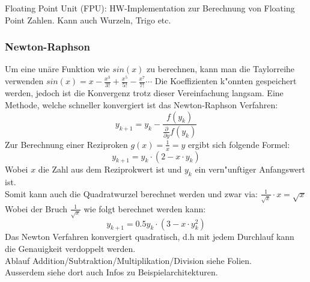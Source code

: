 Floating Point Unit (FPU): HW-Implementation zur Berechnung von Floating Point Zahlen. Kann auch Wurzeln, Trigo etc.\\

\subsubsection{Newton-Raphson}
Um eine unäre Funktion wie $sin(x)$ zu berechnen, kann man die Taylorreihe verwenden $sin(x) = x - \frac{x^3}{3!} + \frac{x^5}{5!} - \frac{x^7}{7!}\cdots$ Die Koeffizienten k"onnten gespeichert werden, jedoch ist die Konvergenz trotz dieser Vereinfachung langsam. 
Eine Methode, welche schneller konvergiert ist das Newton-Raphson Verfahren: 
\begin{equation}
y_{k+1} = y_k - \frac{f(y_k)}{\frac{\partial}{\partial y}f(y_k)}
\end{equation}
Zur Berechnung einer Reziproken $g(x)=\frac{1}{x}=y$ ergibt sich folgende Formel: 
\begin{equation}
y_{k+1} = y_k\cdot (2-x\cdot y_k)
\end{equation}
Wobei $x$ die Zahl aus dem Reziprokwert ist und $y_k$ ein vern"unftiger Anfangswert ist. \\

Somit kann auch die Quadratwurzel berechnet werden und zwar via: $\frac{1}{\sqrt{x}} \cdot x = \sqrt{x}$\\
Wobei der Bruch $\frac{1}{\sqrt{x}}$ wie folgt berechnet werden kann:
\begin{equation}
y_{k+1} = 0.5y_k\cdot (3-x\cdot y_k^2)
\end{equation}
Das Newton Verfahren konvergiert quadratisch, d.h mit jedem Durchlauf kann die Genauigkeit verdoppelt werden.\\
Ablauf Addition/Subtraktion/Multiplikation/Division siehe Folien.\\
Ausserdem siehe dort auch Infos zu Beispielarchitekturen.
